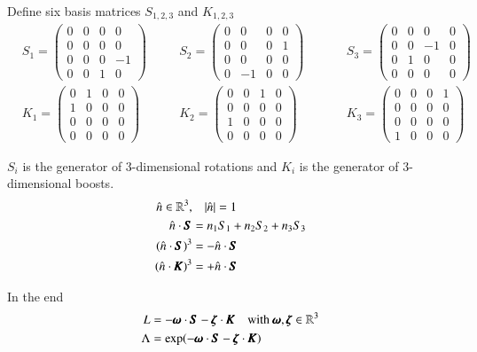 Define six basis matrices $S_{1,2,3}$ and $K_{1,2,3}$
\begin{align*}
   &S_1 = \begin{pmatrix} 0&0&0&0 \\ 0&0&0&0 \\ 0&0&0&-1 \\ 0&0&1&0\end{pmatrix} \quad 
   &&S_2 = \begin{pmatrix} 0&0&0&0 \\ 0&0&0&1 \\ 0&0&0&0 \\ 0&-1&0&0\end{pmatrix} \quad
   &&&S_3 = \begin{pmatrix} 0&0&0&0 \\ 0&0&-1&0 \\ 0&1&0&0 \\ 0&0&0&0\end{pmatrix} \\
   &K_1 = \begin{pmatrix} 0&1&0&0 \\ 1&0&0&0 \\ 0&0&0&0 \\ 0&0&0&0\end{pmatrix} \quad 
   &&K_2 = \begin{pmatrix} 0&0&1&0 \\ 0&0&0&0 \\ 1&0&0&0 \\ 0&0&0&0\end{pmatrix} \quad 
   &&&K_3 = \begin{pmatrix} 0&0&0&1 \\ 0&0&0&0 \\ 0&0&0&0 \\ 1&0&0&0\end{pmatrix} \quad 
\end{align*}

$S_i$ is the generator of $3$-dimensional rotations and $K_i$ is the generator of $3$-dimensional boosts.
\begin{align*}
   \hat{n} \in \mathbb{R}^3, & \quad |\hat{n}| = 1\\
   \hat{n} \cdot \pmb{S} &= n_1S_1 + n_2 S_2 + n_3 S_3 \\
   (\hat{n}\cdot \pmb{S})^3 &= - \hat{n} \cdot \pmb{S} \\
   (\hat{n}\cdot \pmb{K})^3 &= + \hat{n} \cdot \pmb{S}
\end{align*}

In the end
\begin{align}
   L &= -\pmb{\omega} \cdot \pmb{S} - \pmb{\zeta}\cdot \pmb{K} \quad \text{with }\pmb{\omega}, \pmb{\zeta} \in \mathbb{R}^3 \\
   \Lambda &= \exp(-\pmb{\omega} \cdot \pmb{S} - \pmb{\zeta}\cdot \pmb{K})
\end{align}

